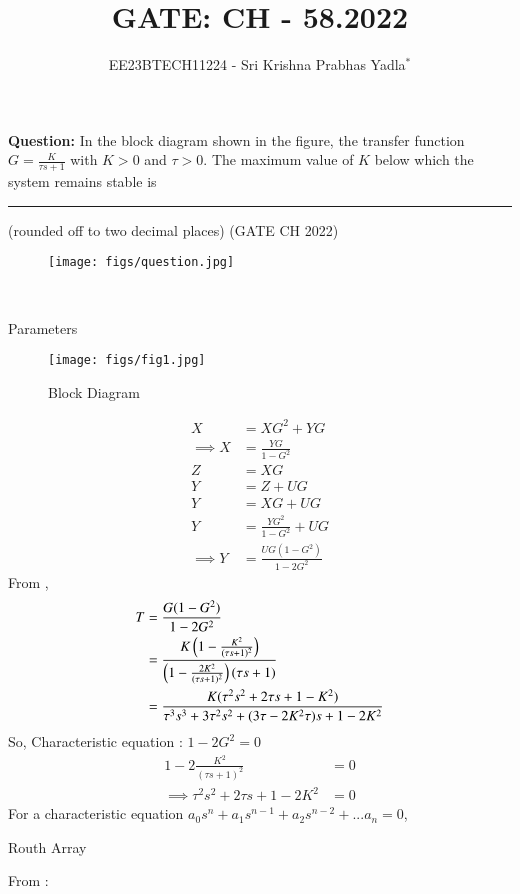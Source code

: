 \documentclass[journal,12pt,twocolumn]{IEEEtran}
\theoremstyle{remark}
\begin{document}

\vspace{3cm}

\title{GATE: CH - 58.2022}
\author{EE23BTECH11224 - Sri Krishna Prabhas Yadla$^{*}$%
}
\maketitle
\newpage
\bigskip

\renewcommand{\thefigure}{\arabic{figure}}
\renewcommand{\thetable}{\arabic{table}}


\vspace{3cm}
\textbf{Question:} In the block diagram shown in the figure, the transfer function $G=\frac{K}{\tau s+1}$ with $K>0$ and $\tau>0$. The maximum value of $K$ below which the system remains stable is \rule{1cm}{0.15mm}(rounded off to two decimal places) \hfill (GATE CH 2022)
\begin{figure}[htbp]
	\texttt{[image: figs/question.jpg]}
	\label{fig:question}
\end{figure}\\
\solution
\begin{table}[htbp]
	\centering
	\def\arraystretch{1.5}
	
	\caption{Parameters}
	\label{tab:parameters}
\end{table}
\begin{figure}[htbp]
	\texttt{[image: figs/fig1.jpg]}
	\caption{Block Diagram}
	\label{fig1}
\end{figure}
\begin{align}
X &= XG^2+YG \\
\implies X &= \frac{YG}{1-G^2}\\
Z &= XG\\
Y &= Z+UG\\
Y &= XG+UG\\
Y &= \frac{YG^2}{1-G^2}+UG\\
\implies Y &= \frac{UG(1-G^2)}{1-2G^2} 
\end{align}
From ,
\begin{align}
T &= \frac{G(1-G^2)}{1-2G^2}\\
&= \frac{K\left(1-\frac{K^2}{(\tau s+1)^2}\right)}{\left(1-\frac{2K^2}{(\tau s+1)^2}\right)(\tau s+1)}\\
&= \frac{K(\tau^2s^2+2\tau s+1-K^2)}{\tau^3s^3+3\tau^2s^2+(3\tau-2K^2\tau) s+1-2K^2}
\end{align}
So, Characteristic equation : $1-2G^2 = 0$ 
\begin{align}
1-2\frac{K^2}{(\tau s+1)^2}&= 0 \\
\implies \tau^2s^2+2\tau s+1-2K^2 &= 0
\end{align}
For a characteristic equation $a_0s^n+a_1s^{n-1}+a_2s^{n-2}+...a_n=0$,
\begin{table}[htbp]
\setlength{\extrarowheight}{8pt}
\centering

\caption{Routh Array}
\label{tab:generalroutharray}
\end{table}
\newline
From :
\end{document}
